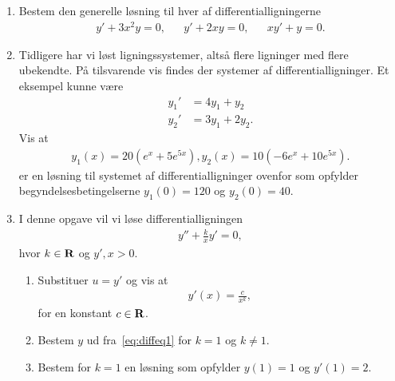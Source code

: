 \begin{enumerate}
	\item Bestem den generelle løsning til hver af differentialligningerne
	\begin{align*}
	y'+3x^2y=0,&& y'+2xy=0,&& xy'+y=0.
	\end{align*}
	
	\item Tidligere har vi løst ligningssystemer, altså flere ligninger med flere ubekendte. På tilsvarende vis findes der systemer af differentialligninger. Et eksempel kunne være 
	\begin{align*}
	y_1'&=4y_1+y_2\\
	y_2'&=3y_1+2y_2.
	\end{align*}
	Vis at 
	\begin{align*}
	y_1(x)=20(e^x+5e^{5x}),
	y_2(x)=10(-6e^x+10e^{5x}).
	\end{align*}
	er en løsning til systemet af differentialligninger ovenfor som opfylder begyndelsesbetingelserne $y_1(0)=120$ og $y_2(0)=40$.
	
	
	\item I denne opgave vil vi løse differentialligningen 
	\begin{align*}
	y''+\frac{k}{x}y'=0,
	\end{align*}
	hvor $k\in \mathbf{R}$ og $y',x>0$.
	
	\begin{enumerate}
		\item Substituer $u=y'$ og vis at 
		\begin{align}\label{eq:diffeq1}
		y'(x)=\frac{c}{x^k},
		\end{align}
		for en konstant $c\in \mathbf{R}$. 
		\item Bestem $y$ ud fra~\eqref{eq:diffeq1} for $k=1$ og $k\neq 1$.
		\item Bestem for $k=1$ en løsning som opfylder $y(1)=1$ og $y'(1)=2$.
		
	\end{enumerate}
	
	
\end{enumerate}